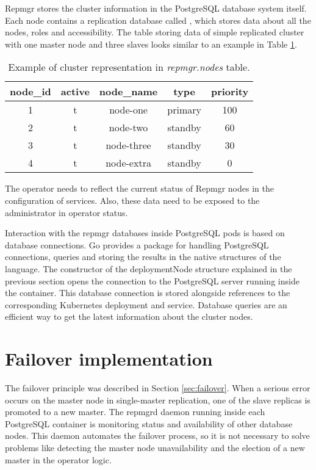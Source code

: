 \documentclass[
  digital, %
  twoside, %
  table,   %
  nolof,   %
  nolot,   %
]{fithesis3}
\begin{document}
Repmgr stores the cluster information in the PostgreSQL database system itself. Each node contains a replication database called , which stores data about all the nodes, roles and accessibility. The table storing data of simple replicated cluster with one master node and three slaves looks similar to an example in Table \ref{table:repmgr_nodes}.

\begin{table}[ht!]
\centering
\begin{tabular}{|c c c c c|}
 \hline
 node\_id & active & node\_name & type & priority \\ [0.5ex]
 \hline
 1 & t & node-one & primary & 100 \\

 2 & t & node-two & standby & 60 \\

 3 & t & node-three & standby & 30 \\

 4 & t & node-extra & standby & 0 \\ [1ex]
 \hline
\end{tabular}
\caption{Example of cluster representation in \textit{repmgr.nodes} table.}
\label{table:repmgr_nodes}
\end{table}

The operator needs to reflect the current status of Repmgr nodes in the configuration of services. Also, these data need to be exposed to the administrator in operator status.

Interaction with the repmgr databases inside PostgreSQL pods is based on database connections. Go provides a package for handling PostgreSQL connections, queries and storing the results in the native structures of the language. The constructor of the deploymentNode structure explained in the previous section opens the connection to the PostgreSQL server running inside the container. This database connection is stored alongside references to the corresponding Kubernetes deployment and service. Database queries are an efficient way to get the latest information about the cluster nodes.

\section{Failover implementation}
The failover principle was described in Section \ref{sec:failover}. When a serious error occurs on the master node in single-master replication, one of the slave replicas is promoted to a new master. The repmgrd daemon running inside each PostgreSQL container is monitoring status and availability of other database nodes. This daemon automates the failover process, so it is not necessary to solve problems like detecting the master node unavailability and the election of a new master in the operator logic.
\end{document}
